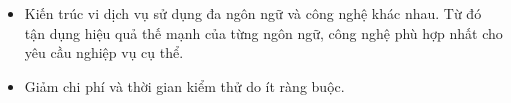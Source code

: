 \begin{itemize}
          \begin{itemize}

              \item Kiến trúc vi dịch vụ sử dụng đa ngôn ngữ và công nghệ khác nhau. Từ đó tận dụng hiệu quả thế mạnh của từng ngôn ngữ, công nghệ phù hợp nhất cho yêu cầu nghiệp vụ cụ thể.

              \item Giảm chi phí và thời gian kiểm thử do ít ràng buộc.



          \end{itemize}

\end{itemize}


%






















